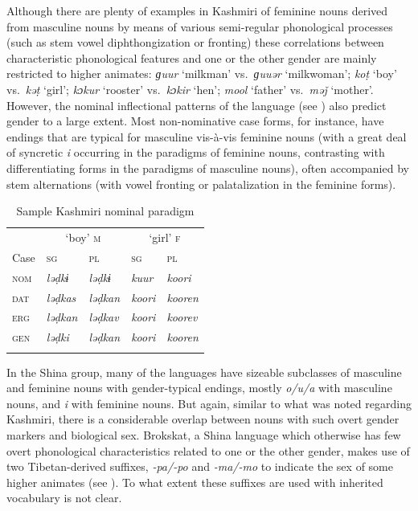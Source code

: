 \documentclass[output=collectionpaper]{langsci/langscibook}
\begin{document}
Although there are plenty of examples in Kashmiri of feminine nouns derived from masculine nouns by means of various semi-regular phonological processes (such as stem vowel diphthongization or fronting) these correlations between characteristic phonological features and one or the other gender are mainly restricted to higher animates: \textit{ɡuur} `milkman' vs.\ \textit{ɡuuər} `milkwoman'; \textit{koṭ} `boy' vs.\ \textit{kəṭ} `girl'; \textit{kɔkur} `rooster' vs.\ \textit{kɔkir} `hen'; \textit{mool} `father' vs.\ \textit{məǰ} `mother'. However, the nominal inflectional patterns of the language (see ) also predict gender to a large extent. Most non-nominative case forms, for instance, have endings that are typical for masculine vis-à-vis feminine nouns (with a great deal of syncretic \textit{i} occurring in the paradigms of feminine nouns, contrasting with differentiating forms in the paradigms of masculine nouns), often accompanied by stem alternations (with vowel fronting or palatalization in the feminine forms).


\begin{table}[htb]
\begin{tabularx}{0.6\textwidth}{XXXXX}
\lsptoprule
& \multicolumn{2}{c}{`boy' \textsc{m}} & \multicolumn{2}{c}{`girl' \textsc{f}}\\
Case & \scshape sg & \scshape pl & \scshape sg & \scshape pl\\
\midrule
\scshape nom & \itshape ləḍkɨ & \itshape ləḍkɨ & \itshape kuur & \itshape koori\\
\scshape dat & \itshape ləḍkas & \itshape ləḍkan & \itshape koori & \itshape kooren\\
\scshape erg & \itshape ləḍkan & \itshape ləḍkav & \itshape koori & \itshape koorev\\
\scshape gen & \itshape ləḍki & \itshape ləḍkan & \itshape koori & \itshape kooren\\
\lspbottomrule
\end{tabularx}
\caption{Sample Kashmiri nominal paradigm \citep[909]{Koul2003}}
\label{tab:Lilje:5}
\end{table}


In the Shina group, many of the languages have sizeable subclasses of masculine and feminine nouns with gender-typical endings, mostly \textit{o/u/a} with masculine nouns, and \textit{i} with feminine nouns. But again, similar to what was noted regarding Kashmiri, there is a considerable overlap between nouns with such overt gender markers and biological sex. Brokskat, a Shina language which otherwise has few overt phonological characteristics related to one or the other gender, makes use of two Tibetan-derived suffixes, \textit{\nobreakdash-pa/\nobreakdash-po} and \textit{\nobreakdash-ma/\nobreakdash-mo} to indicate the sex of some higher animates (see ). To what extent these suffixes are used with inherited vocabulary is not clear.
\end{document}
